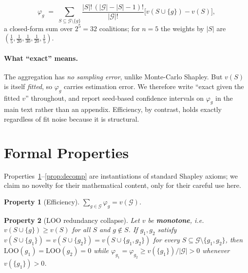 \documentclass[11pt]{article}
\newtheorem{property}{Property}
\newcommand{\G}{\mathcal{G}}
\newcommand{\LOO}{\mathrm{LOO}}
\begin{document}
\begin{equation}
\varphi_g \;=\; \sum_{S \subseteq \G \setminus \{g\}}
\frac{|S|!\,(|\G| - |S| - 1)!}{|\G|!}
\bigl[ v(S \cup \{g\}) - v(S) \bigr],
\end{equation}
a closed-form sum over $2^5 = 32$ coalitions; for $n=5$ the weights by $|S|$
are $(\tfrac15, \tfrac1{20}, \tfrac1{30}, \tfrac1{20}, \tfrac15)$.

\paragraph{What ``exact'' means.}
The aggregation has \emph{no sampling error}, unlike Monte-Carlo Shapley. But
$v(S)$ is itself \emph{fitted}, so $\varphi_g$ carries estimation error. We
therefore write ``exact given the fitted $v$'' throughout, and report
seed-based confidence intervals on $\varphi_g$ in the main text rather than an
appendix. Efficiency, by contrast, holds exactly regardless of fit noise
because it is structural.

\section{Formal Properties}\label{sec:theory}

Properties~\ref{prop:eff}--\ref{prop:decomp} are instantiations of standard
Shapley axioms; we claim no novelty for their mathematical content, only for
their careful use here.

\begin{property}[Efficiency]\label{prop:eff}
$\sum_{g \in \G} \varphi_g = v(\G)$.
\end{property}

\begin{property}[LOO redundancy collapse]\label{prop:loo}
Let $v$ be \textbf{monotone}, i.e.\ $v(S \cup \{g\}) \ge v(S)$ for all $S$ and
$g \notin S$. If $g_1, g_2$ satisfy
$v(S \cup \{g_1\}) = v(S \cup \{g_2\}) = v(S \cup \{g_1,g_2\})$ for every
$S \subseteq \G \setminus \{g_1,g_2\}$, then
$\LOO(g_1) = \LOO(g_2) = 0$ while
$\varphi_{g_1} = \varphi_{g_2} \ge v(\{g_1\})/|\G| > 0$
whenever $v(\{g_1\}) > 0$.
\end{property}
\end{document}
